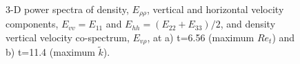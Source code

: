 \documentclass[11pt]{article}
\begin{document}
\begin{figure}[h]
\\
\caption{3-D power spectra of density, $E_{\rho\rho}$, vertical and horizontal 
velocity components, $E_{vv}= E_{11}$ and $E_{hh}= (E_{22}+E_{33})/2$, and 
density vertical velocity co-spectrum, $E_{v\rho}$, at a) t=6.56 (maximum 
$Re_t$) and b) t=11.4 (maximum $\tilde{k}$).
}
\label{figure7}
\end{figure}
\end{document}
